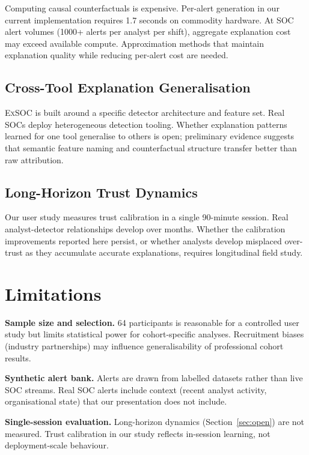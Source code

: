 \documentclass[sigconf,nonacm]{acmart}
\begin{document}
Computing causal counterfactuals is expensive. Per-alert generation in our
current implementation requires 1.7 seconds on commodity hardware. At SOC
alert volumes (1000+ alerts per analyst per shift), aggregate explanation
cost may exceed available compute. Approximation methods that maintain
explanation quality while reducing per-alert cost are needed.

\subsection{Cross-Tool Explanation Generalisation}

\textsc{ExSOC} is built around a specific detector architecture and
feature set. Real SOCs deploy heterogeneous detection tooling. Whether
explanation patterns learned for one tool generalise to others is open;
preliminary evidence suggests that semantic feature naming and
counterfactual structure transfer better than raw attribution.

\subsection{Long-Horizon Trust Dynamics}

Our user study measures trust calibration in a single 90-minute session.
Real analyst-detector relationships develop over months. Whether the
calibration improvements reported here persist, or whether analysts
develop misplaced over-trust as they accumulate accurate explanations,
requires longitudinal field study.

\section{Limitations}

\textbf{Sample size and selection.} 64 participants is reasonable for a
controlled user study but limits statistical power for cohort-specific
analyses. Recruitment biases (industry partnerships) may influence
generalisability of professional cohort results.

\textbf{Synthetic alert bank.} Alerts are drawn from labelled datasets
rather than live SOC streams. Real SOC alerts include context (recent
analyst activity, organisational state) that our presentation does not
include.

\textbf{Single-session evaluation.} Long-horizon dynamics (Section~\ref{sec:open})
are not measured. Trust calibration in our study reflects in-session
learning, not deployment-scale behaviour.
\end{document}

